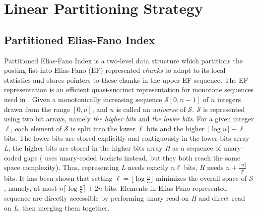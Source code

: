 \documentclass[runningheads]{comsis2}
\begin{document}
\section{Linear Partitioning Strategy}\label{sec:our method}
\subsection{Partitioned Elias-Fano Index}

Partitioned Elias-Fano Index is a two-level data structure which partitions the posting list into Elias-Fano (EF) represented \textit{chunks} to adapt to its local statistics and stores pointers to these chunks in the upper EF sequence.
The EF representation is an efficient quasi-succinct representation for monotone sequences used in \cite{elias1974efficient,vigna2013quasi}.
Given a monotonically increasing sequence $ \mathcal{S}[0, n-1] $ of $ n $ integers drawn from the range $ [0, u] $, and $ u $ is called an \textit{universe} of $ \mathcal{S} $.
$ \mathcal{S} $ is represented using two bit arrays, namely \textit{the higher bits} and \textit{the lower bits}.
For a given integer $ \ell $, each element of $ \mathcal{S} $ is split into the lower $ \ell $ bits and the higher $ \lceil \log u \rceil - \ell$ bits.
The lower bits are stored explicitly and contiguously in the lower bits array \textit{L}, the higher bits are stored in the higher bits array \textit{H} as a sequence of unary-coded gaps (\cite{ottaviano2014partitioned} uses unary-coded buckets instead, but they both reach the same space complexity).
Thus, representing \textit{L} needs exactly $ n\ell $ bits, \textit{H} needs $ n + \frac{\lceil u \rceil}{2^{\ell}} $ bits.
It has been shown that setting $ \ell = \lfloor \log \frac{u}{n} \rfloor $ minimizes the overall space of $ \mathcal{S} $, namely, at most $ n \lceil \log \frac{u}{n} \rceil + 2 n $ bits.
Elements in Elias-Fano represented sequence are directly accessible by performing unary read on \textit{H} and direct read on \textit{L}, then merging them together.
\end{document}
